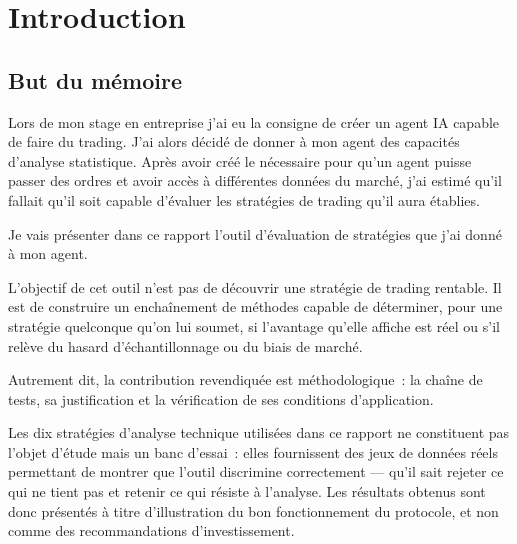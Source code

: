 \chapter*{Introduction}
\label{chap:intro}

\section*{But du mémoire}
\label{sec:but}


Lors de mon stage en entreprise j'ai eu la consigne de créer un agent IA capable de faire du trading.
J'ai alors décidé de donner à mon agent des capacités d'analyse statistique.
Après avoir créé le nécessaire pour qu'un agent puisse passer des ordres et
avoir accès à différentes données du marché, j'ai estimé qu'il fallait qu'il soit capable d'évaluer
les stratégies de trading qu'il aura établies.

Je vais présenter dans ce rapport l'outil d'évaluation de stratégies que
j'ai donné à mon agent.

L'objectif de cet outil n'est pas de découvrir une stratégie de trading
rentable. Il est de construire un enchaînement de méthodes capable de
déterminer, pour une stratégie quelconque qu'on lui soumet, si l'avantage
qu'elle affiche est réel ou s'il relève du hasard d'échantillonnage
ou du biais de marché.

Autrement dit, la contribution revendiquée est méthodologique~:
la chaîne de tests, sa justification et la vérification de ses conditions
d'application. 

Les dix stratégies d'analyse technique utilisées dans ce
rapport ne constituent pas l'objet d'étude mais un banc d'essai~:
elles fournissent des jeux de données réels permettant de
montrer que l'outil discrimine correctement — qu'il sait rejeter
ce qui ne tient pas et retenir ce qui résiste à l'analyse. Les résultats
obtenus sont donc présentés à titre d'illustration du bon
fonctionnement du protocole, et non comme des recommandations
d'investissement.

